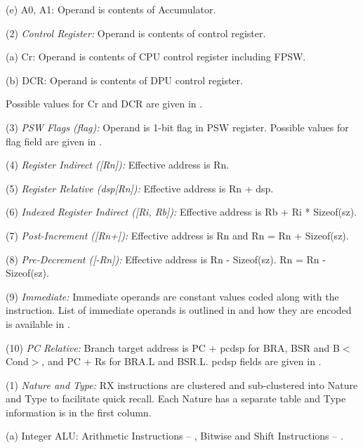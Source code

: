     (e) A0, A1: Operand is contents of Accumulator.

\levelone
(2) \emph{Control Register:} %
Operand is contents of control register.

    \leveltwo
    (a) Cr: Operand is contents of CPU control register including FPSW.

    (b) DCR: Operand is contents of DPU control register.

\levelone
Possible values for Cr and DCR are given in .

(3) \emph{PSW Flags (flag):} %
Operand is 1-bit flag in PSW register. Possible values for flag field are given in 
.

(4) \emph{Register Indirect ([Rn]):} %
Effective address is Rn.

(5) \emph{Register Relative (dsp[Rn]):} %
Effective address is Rn + dsp.

(6) \emph{Indexed Register Indirect ([Ri, Rb]):} %
Effective address is Rb + Ri * Sizeof(sz).

(7) \emph{Post-Increment ([Rn+]):} %
Effective address is Rn and Rn = Rn + Sizeof(sz).

(8) \emph{Pre-Decrement ([-Rn]):} %
Effective address is Rn - Sizeof(sz). Rn = Rn - Sizeof(sz).

(9) \emph{Immediate:} %
Immediate operands are constant values coded along with the instruction. List of immediate 
operands is outlined in  and how they
are encoded is available in .

(10) \emph{PC Relative:} %
Branch target address is PC + pcdsp for BRA, BSR and B$<$Cond$>$, and PC + Rs for BRA.L and BSR.L. 
pcdsp fields are given in .



\SOPNoteBody

(1) \emph{Nature and Type:} %
RX instructions are clustered and sub-clustered into Nature and Type to facilitate quick recall. Each Nature has 
a separate table and Type information is in the first column.

    \leveltwo
    (a) Integer ALU: Arithmetic Instructions -- , Bitwise and 
    Shift Instructions -- .

